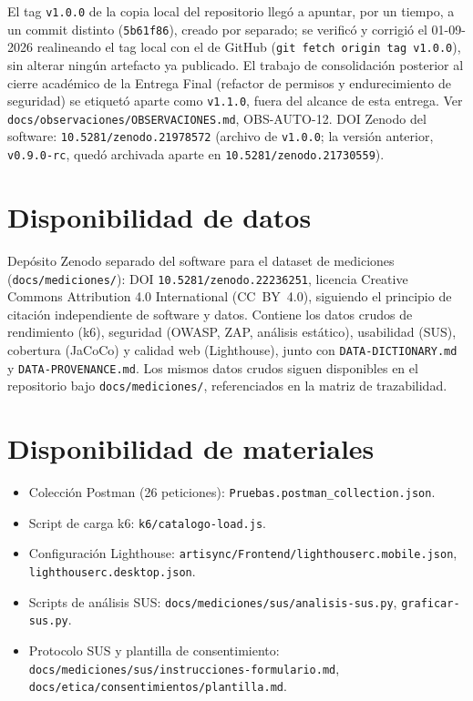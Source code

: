 El tag \texttt{v1.0.0} de la copia local del repositorio llegó a apuntar,
por un tiempo, a un commit distinto (\texttt{5b61f86}), creado por
separado; se verificó y corrigió el 01-09-2026 realineando el tag local
con el de GitHub (\texttt{git fetch origin tag v1.0.0}), sin alterar
ningún artefacto ya publicado. El trabajo de consolidación posterior al
cierre académico de la Entrega Final (refactor de permisos y
endurecimiento de seguridad) se etiquetó aparte como \texttt{v1.1.0},
fuera del alcance de esta entrega. Ver
\texttt{docs/observaciones/OBSERVACIONES.md}, OBS-AUTO-12.
DOI Zenodo del software:
\texttt{10.5281/zenodo.21978572} (archivo de \texttt{v1.0.0}; la versión
anterior, \texttt{v0.9.0-rc}, quedó archivada aparte en
\texttt{10.5281/zenodo.21730559}).

\section{Disponibilidad de datos}

Depósito Zenodo separado del software para el dataset de
mediciones (\texttt{docs/mediciones/}): DOI
\texttt{10.5281/zenodo.22236251}, licencia Creative Commons
Attribution 4.0 International (CC~BY~4.0), siguiendo el principio de
citación independiente de software y datos. Contiene los datos crudos
de rendimiento (k6), seguridad (OWASP, ZAP, análisis estático),
usabilidad (SUS), cobertura (JaCoCo) y calidad web (Lighthouse), junto
con \texttt{DATA-DICTIONARY.md} y \texttt{DATA-PROVENANCE.md}. Los
mismos datos crudos siguen disponibles en el repositorio bajo
\texttt{docs/mediciones/}, referenciados en la matriz de trazabilidad.

\section{Disponibilidad de materiales}

\begin{itemize}
  \item Colección Postman (26 peticiones):
    \texttt{Pruebas.postman\_collection.json}.
  \item Script de carga k6: \texttt{k6/catalogo-load.js}.
  \item Configuración Lighthouse:
    \texttt{artisync/Frontend/lighthouserc.mobile.json},
    \texttt{lighthouserc.desktop.json}.
  \item Scripts de análisis SUS: \texttt{docs/mediciones/sus/analisis-sus.py},
    \texttt{graficar-sus.py}.
  \item Protocolo SUS y plantilla de consentimiento:
    \texttt{docs/mediciones/sus/instrucciones-formulario.md},
    \texttt{docs/etica/consentimientos/plantilla.md}.
\end{itemize}

